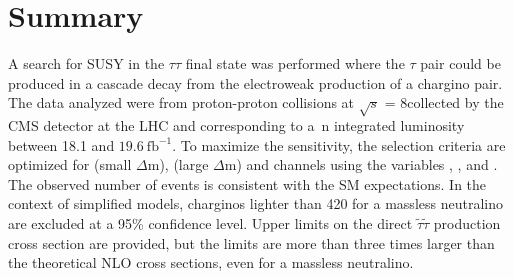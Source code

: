 \section{Summary}
\label{sect:conclusion}
A search for SUSY in the $\tau\tau$ final state was performed where the
$\tau$ pair could be produced in a cascade decay from the electroweak production of a chargino pair.  The data analyzed were from proton-proton collisions
at $\sqrt{s}$ = 8\TeV collected by the CMS detector at the LHC and corresponding to a\
n integrated luminosity between 18.1 and $19.6~\mathrm{fb}^{-1}$.%
To maximize the sensitivity, the selection criteria are optimized for \tauTau (small $\Delta$m), 
\tauTau (large $\Delta$m) and \leptonTau channels using the variables \mttwo, \tauMT, and \SumMT.
The observed number of events is consistent with the SM expectations. 
In the context of simplified models, charginos lighter than 420\GeV 
for a massless neutralino are excluded at a 95\% confidence level.
Upper limits on the direct $\tilde{\tau}\tilde{\tau}$ production cross section are provided, but the limits are more than three times
larger than the theoretical NLO cross sections, 
even for a massless neutralino.

